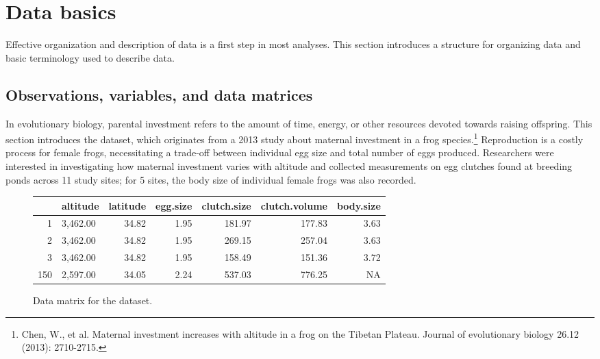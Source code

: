 

\section{Data basics}
\label{dataBasics}

Effective organization and description of data is a first step in most analyses. This section introduces a structure for organizing data and basic terminology used to describe data.

\subsection{Observations, variables, and data matrices}
\label{frogDataExample}


In evolutionary biology, parental investment refers to the amount of time, energy, or other resources devoted towards raising offspring. This section introduces the  dataset, which originates from a 2013 study about maternal investment in a frog species.\footnote{Chen, W., et al. Maternal investment increases with altitude in a frog on the Tibetan Plateau. Journal of evolutionary biology 26.12 (2013): 2710-2715.} Reproduction is a costly process for female frogs, necessitating a trade-off between individual egg size and total number of eggs produced. Researchers were interested in investigating how maternal investment varies with altitude and collected measurements on egg clutches found at breeding ponds across 11 study sites; for 5 sites, the body size of individual female frogs was also recorded.

\begin{figure}[ht]
\centering
\begin{tabular}{rlrrrrr}
  \hline
 & altitude & latitude & egg.size & clutch.size & clutch.volume & body.size \\ 
  \hline
1 & 3,462.00 & 34.82 & 1.95 & 181.97 & 177.83 & 3.63 \\ 
  2 & 3,462.00 & 34.82 & 1.95 & 269.15 & 257.04 & 3.63 \\ 
  3 & 3,462.00 & 34.82 & 1.95 & 158.49 & 151.36 & 3.72 \\ 
  150 & 2,597.00 & 34.05 & 2.24 & 537.03 & 776.25 & NA \\ 
   \hline
\end{tabular}
\caption{Data matrix for the  dataset.} 
\label{frogDF}
\end{figure}

